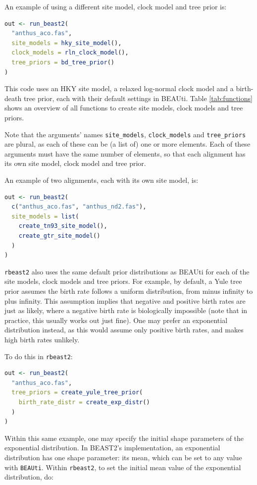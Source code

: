 \documentclass{article}
\begin{document}
An example of using a different site model, clock model 
and tree prior is:

\begin{lstlisting}[language=R, floatplacement=H]
out <- run_beast2(
  "anthus_aco.fas",
  site_models = hky_site_model(),
  clock_models = rln_clock_model(),
  tree_priors = bd_tree_prior()
)
\end{lstlisting}

This code uses an HKY site model, a relaxed log-normal clock model and a 
birth-death tree prior, each with their default settings in BEAUti.
Table \ref{tab:functions} shows an overview of all functions to 
create site models, clock models and tree priors.

Note that the arguments' names \verb;site_models;, \verb;clock_models; 
and \verb;tree_priors; are plural, as each of these
can be (a list of) one or more elements. Each of these arguments must 
have the same number of elements, so that each alignment has its
own site model, clock model and tree prior. 

An example of two alignments, each with its own site model, is:

\begin{lstlisting}[language=R, floatplacement=H]
out <- run_beast2(
  c("anthus_aco.fas", "anthus_nd2.fas"),
  site_models = list(
    create_tn93_site_model(), 
    create_gtr_site_model()
  )
)
\end{lstlisting}

\verb;rbeast2; also uses the same default prior distributions as BEAUti 
for each of the site models, clock models and tree priors. 
For example, by default, a Yule tree prior assumes the birth rate 
follows a uniform distribution, 
from minus infinity to plus infinity. 
This assumption implies that negative and positive birth rates are just as likely, 
where a negative birth rate is biologically impossible (note that 
in practice, this usually works out just fine).
One may prefer an exponential distribution instead, 
as this would assume only positive birth rates, 
and makes high birth rates unlikely.

To do this in \verb;rbeast2;:

\begin{lstlisting}[language=R, floatplacement=H]
out <- run_beast2(
  "anthus_aco.fas",
  tree_priors = create_yule_tree_prior(
    birth_rate_distr = create_exp_distr()    
  )
)
\end{lstlisting}

Within this same example, one may specify
the initial shape parameters of the exponential distribution.
In BEAST2's implementation, an exponential distribution 
has one shape parameter: its mean, which can be set to any
value with \verb;BEAUti;. Within \verb;rbeast2;, to set the 
initial mean value of the exponential distribution, do: 
\end{document}
